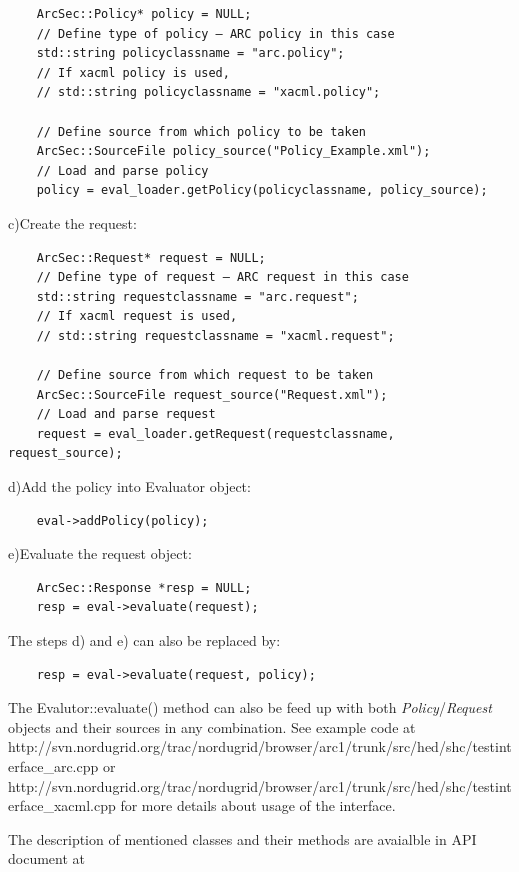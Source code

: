 \documentclass{article}                            %
\begin{document}
\begin{verbatim}
    ArcSec::Policy* policy = NULL;
    // Define type of policy – ARC policy in this case
    std::string policyclassname = "arc.policy";
    // If xacml policy is used,
    // std::string policyclassname = "xacml.policy";

    // Define source from which policy to be taken
    ArcSec::SourceFile policy_source("Policy_Example.xml");
    // Load and parse policy
    policy = eval_loader.getPolicy(policyclassname, policy_source);
\end{verbatim}

c)Create the request:
\begin{verbatim}
    ArcSec::Request* request = NULL;
    // Define type of request – ARC request in this case
    std::string requestclassname = "arc.request";
    // If xacml request is used,
    // std::string requestclassname = "xacml.request";

    // Define source from which request to be taken
    ArcSec::SourceFile request_source("Request.xml");
    // Load and parse request
    request = eval_loader.getRequest(requestclassname, request_source);
\end{verbatim}

d)Add the policy into Evaluator object:
\begin{verbatim}
    eval->addPolicy(policy);
\end{verbatim}

e)Evaluate the request object:
\begin{verbatim}
    ArcSec::Response *resp = NULL;
    resp = eval->evaluate(request);
\end{verbatim}

The steps d) and e) can also be replaced by:

\begin{verbatim}
    resp = eval->evaluate(request, policy);
\end{verbatim}

The Evalutor::evaluate() method can also be feed up with both \textit{Policy}/\textit{Request} objects and their sources in any combination. See example code at http://svn.nordugrid.org/trac/nordugrid/browser/arc1/trunk/src/hed/shc/testinterface\_arc.cpp or http://svn.nordugrid.org/trac/nordugrid/browser/arc1/trunk/src/hed/shc/testinterface\_xacml.cpp for more details about usage of the interface.

The description of mentioned classes and their methods are avaialble in  API document at
\end{document}
